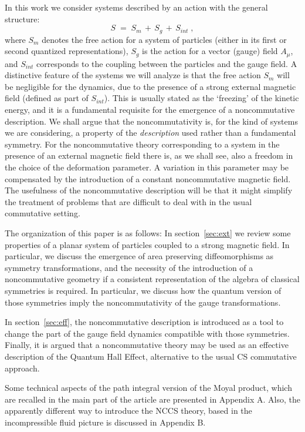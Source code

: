 \documentclass[a4paper,12pt]{article}
\begin{document}
In this work we consider systems described by an action with the
general structure:
\begin{equation}
  \label{eq:defact}
S \;=\; S_m \,+\, S_g \,+\, S_{int} \;,
\end{equation}
where $S_m$ denotes the free action for a system of particles
(either
in its first or second quantized representations), $S_g$ is the
action
for a vector (gauge) field $A_\mu$, and $S_{int}$ corresponds to
the
coupling between the particles and the gauge field. A distinctive
feature of the systems we will analyze is that the free action
$S_m$
will be negligible for the dynamics, due to the presence of a
strong
external magnetic field (defined as part of $S_{int}$). This is
usually stated as the `freezing' of the kinetic energy, and it is a
fundamental requisite for the emergence of a noncommutative
description. We shall argue that the noncommutativity is, for the
kind
of systems we are considering, a property of the {\em
description\/}
used rather than a fundamental symmetry. For the noncommutative
theory
corresponding to a system in the presence of an external magnetic
field there is, as we shall see, also a freedom in the choice of
the
deformation parameter. A variation in this parameter may be
compensated by the introduction of a constant noncommutative
magnetic
field. The usefulness of the noncommutative description will be
that
it might simplify the treatment of problems that are difficult to
deal
with in the usual commutative setting.
  

The organization of this paper is as follows: In
section~\ref{sec:ext}
we review some properties of a planar system of particles coupled
to a
strong magnetic field. In particular, we discuss the emergence of
area
preserving diffeomorphisms as symmetry transformations, and the
necessity of the introduction of a noncommutative geometry if a
consistent representation of the algebra of classical symmetries is
required. In particular, we discuss how the quantum version of
those
symmetries imply the noncommutativity of the gauge transformations.

In section~\ref{sec:eff}, the noncommutative description is
introduced
as a tool to change the part of the gauge field dynamics compatible
with those symmetries.  Finally, it is argued that a noncommutative
theory may be used as an effective description of the Quantum Hall
Effect, alternative to the usual CS commutative approach.

Some technical aspects of the path integral version of the Moyal
product, which are recalled in the main part of the article are
presented in Appendix A. Also, the apparently different way to
introduce the NCCS theory, based in the incompressible fluid
picture
is discussed in Appendix B.
 
\end{document}
